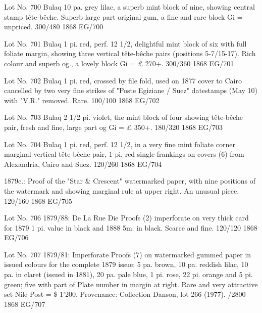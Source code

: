 \documentclass[justified]{tufte-book}
\begin{document}
%
{Lot No. 700
Bulaq 10 pa. grey lilac, a superb mint block of nine, showing central stamp tête-bêche. Superb large part original gum, a fine and rare block Gi = unpriced. 300/480
}%
{1868}%
{EG/700}%
{}%
{}
{}%
{}

%
{Lot No. 701
Bulaq 1 pi. red, perf. 12 1/2, delightful mint block of six with full foliate margin, showing three vertical tête-bêche pairs (positions 5-7/15-17). Rich colour and superb og., a lovely block Gi = £ 270+. 300/360
}%
{1868}%
{EG/701}%
{}%
{}
{}%
{}

%
{Lot No. 702
Bulaq 1 pi. red, crossed by file fold, used on 1877 cover to Cairo cancelled by two very fine strikes of  "Poste Egiziane / Suez" datestamps (May 10) with "V.R." removed. Rare. 100/100
}%
{1868}%
{EG/702}%
{}%
{}
{}%
{}

%
{Lot No. 703
Bulaq 2 1/2 pi. violet, the mint block of four showing tête-bêche pair, fresh and fine, large part og Gi = £ 350+. 180/320
}%
{1868}%
{EG/703}%
{}%
{}
{}%
{}

%
{Lot No. 704
Bulaq 1 pi. red, perf. 12 1/2, in a very fine mint foliate corner marginal vertical tête-bêche pair, 1 pi. red single frankings on covers (6) from Alexandria, Cairo and Suez. 120/260
}%
{1868}%
{EG/704}%
{}%
{}
{}%
{}

%
{1879c.: Proof of the "Star \& Crescent" watermarked paper, with nine positions of the watermark and showing marginal rule at upper right. An unusual piece. 120/160
}%
{1868}%
{EG/705}%
{}%
{}
{}%
{}




%
{Lot No. 706
1879/88: De La Rue Die Proofs (2) imperforate on very thick card for 1879 1 pi. value in black and 1888  5m. in black. Scarce and fine. 120/120
}%
{1868}%
{EG/706}%
{}%
{}
{}%
{}




%
{Lot No. 707
1879/81: Imperforate Proofs (7) on watermarked gummed paper in issued colours for the complete 1879 issue: 5 pa. brown, 10 pa. reddish lilac, 10 pa. in claret (issued in 1881), 20 pa. pale blue, 1 pi. rose, 22 pi. orange and 5 pi. green; five with part of Plate number in margin at right. Rare and very attractive set Nile Post = \$ 1'200. Provenance: Collection Danson, lot 266 (1977). 
/2800 
}%
{1868}%
{EG/707}%
{}%
{}
{}%
{}
\end{document}
